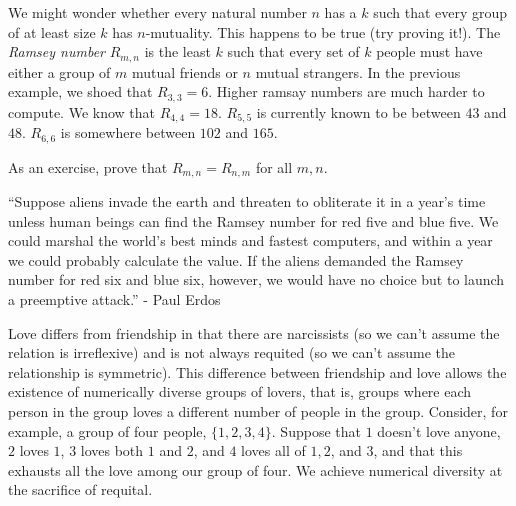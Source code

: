\begin{aside}
We might wonder whether every natural number $n$ has a $k$ such that every group of at least size $k$ has $n$-mutuality. This happens to be true (try proving it!). The \emph{Ramsey number} $R_{m, n}$ is the least $k$ such that every set of $k$ people must have either a group of $m$ mutual friends or $n$ mutual strangers. In the previous example, we shoed that $R_{3, 3} = 6$. Higher ramsay numbers are much harder to compute. We know that $R_{4, 4} = 18$. $R_{5, 5}$ is currently known to be between $43$ and $48$. $R_{6, 6}$ is somewhere between $102$ and $165$. 

As an exercise, prove that $R_{m, n} = R_{n, m}$ for all $m, n$.

``Suppose aliens invade the earth and threaten to obliterate it in a year's time unless human beings can find the Ramsey number for red five and blue five. We could marshal the world's best minds and fastest computers, and within a year we could probably calculate the value. If the aliens demanded the Ramsey number for red six and blue six, however, we would have no choice but to launch a preemptive attack.'' - Paul Erdos
\end{aside}

Love differs from friendship in that there are narcissists (so we can't assume the relation is irreflexive) and is not always requited (so we can't assume the relationship is symmetric). This difference between friendship and love allows the existence of numerically diverse groups of lovers, that is, groups where each person in the group loves a different number of people in the group. Consider, for example, a group of four people, $\{1, 2, 3, 4\}$. Suppose that $1$ doesn't love anyone, $2$ loves $1$, $3$ loves both $1$ and $2$, and $4$ loves all of $1,2$, and $3$, and that this exhausts all the love among our group of four. We achieve numerical diversity at the sacrifice of requital. 

\begin{center}
\end{center}

